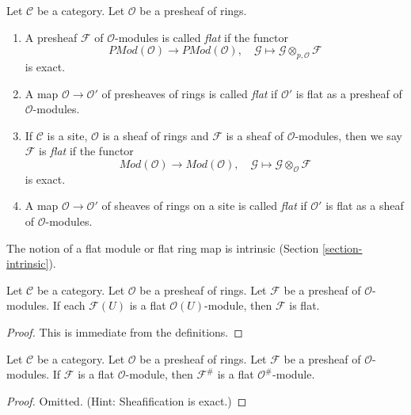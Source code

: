 \begin{definition}
\label{definition-flat}
Let $\mathcal{C}$ be a category.
Let $\mathcal{O}$ be a presheaf of rings.
\begin{enumerate}
\item A presheaf $\mathcal{F}$ of $\mathcal{O}$-modules is called
{\it flat} if the functor
$$
\textit{PMod}(\mathcal{O})
\longrightarrow
\textit{PMod}(\mathcal{O}), \quad
\mathcal{G} \mapsto \mathcal{G} \otimes_{p, \mathcal{O}} \mathcal{F}
$$
is exact.
\item A map $\mathcal{O} \to \mathcal{O}'$ of presheaves of rings
is called {\it flat} if $\mathcal{O}'$ is flat as a presheaf of
$\mathcal{O}$-modules.
\item If $\mathcal{C}$ is a site, $\mathcal{O}$ is a sheaf of rings
and $\mathcal{F}$ is a sheaf of $\mathcal{O}$-modules, then we
say $\mathcal{F}$ is {\it flat} if the functor
$$
\textit{Mod}(\mathcal{O})
\longrightarrow
\textit{Mod}(\mathcal{O}), \quad
\mathcal{G} \mapsto \mathcal{G} \otimes_\mathcal{O} \mathcal{F}
$$
is exact.
\item A map $\mathcal{O} \to \mathcal{O}'$ of sheaves of rings on a site
is called {\it flat} if $\mathcal{O}'$ is flat as a sheaf of
$\mathcal{O}$-modules.
\end{enumerate}
\end{definition}

\noindent
The notion of a flat module or flat ring map is intrinsic
(Section \ref{section-intrinsic}).

\begin{lemma}
\label{lemma-flatness-presheaves}
Let $\mathcal{C}$ be a category.
Let $\mathcal{O}$ be a presheaf of rings.
Let $\mathcal{F}$ be a presheaf of $\mathcal{O}$-modules.
If each $\mathcal{F}(U)$ is a flat $\mathcal{O}(U)$-module,
then $\mathcal{F}$ is flat.
\end{lemma}

\begin{proof}
This is immediate from the definitions.
\end{proof}

\begin{lemma}
\label{lemma-flatness-sheafification}
Let $\mathcal{C}$ be a category.
Let $\mathcal{O}$ be a presheaf of rings.
Let $\mathcal{F}$ be a presheaf of $\mathcal{O}$-modules.
If $\mathcal{F}$ is a flat $\mathcal{O}$-module, then
$\mathcal{F}^\#$ is a flat $\mathcal{O}^\#$-module.
\end{lemma}

\begin{proof}
Omitted. (Hint: Sheafification is exact.)
\end{proof}

